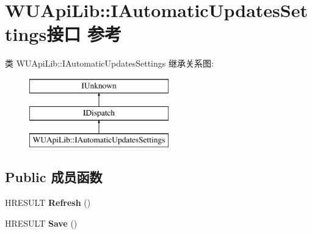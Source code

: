 \hypertarget{interface_w_u_api_lib_1_1_i_automatic_updates_settings}{}\section{W\+U\+Api\+Lib\+:\+:I\+Automatic\+Updates\+Settings接口 参考}
\label{interface_w_u_api_lib_1_1_i_automatic_updates_settings}
类 W\+U\+Api\+Lib\+:\+:I\+Automatic\+Updates\+Settings 继承关系图\+:\begin{figure}[H]
\begin{center}
\leavevmode
\includegraphics[height=3.000000cm]{interface_w_u_api_lib_1_1_i_automatic_updates_settings}
\end{center}
\end{figure}
\subsection*{Public 成员函数}
\begin{DoxyCompactItemize}
\item 
\mbox{\label{interface_w_u_api_lib_1_1_i_automatic_updates_settings_a3532710d98c922ba2343075a4e71eda5}} 
H\+R\+E\+S\+U\+LT {\bfseries Refresh} ()
\item 
\mbox{\label{interface_w_u_api_lib_1_1_i_automatic_updates_settings_a2b64a77ea5a53a358368884d64e885aa}} 
H\+R\+E\+S\+U\+LT {\bfseries Save} ()
\end{DoxyCompactItemize}
